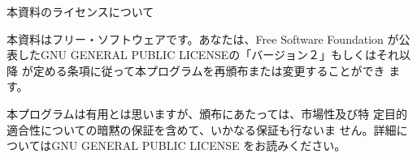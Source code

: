 \documentclass[mingoth,a4paper]{jsarticle}
\begin{document}

\printindex

\newpage
\thispagestyle{empty}\mbox{}%

\begin{center}
本資料のライセンスについて
\end{center}

本資料はフリー・ソフトウェアです。あなたは、Free Software
Foundation が公表したGNU GENERAL PUBLIC LICENSEの「バージョン２」もしくはそれ以降
が定める条項に従って本プログラムを再頒布または変更することができ
ます。

本プログラムは有用とは思いますが、頒布にあたっては、市場性及び特
定目的適合性についての暗黙の保証を含めて、いかなる保証も行ないま
せん。詳細についてはGNU GENERAL PUBLIC LICENSE をお読みください。
\end{document}
